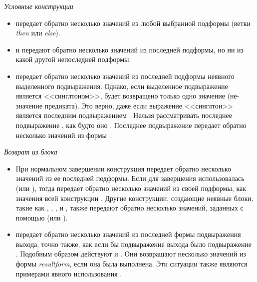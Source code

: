 \begin{flushdesc}
\item[\emph{Условные конструкции}]\leavevmode
\begin{itemize}

\item
{} передает обратно несколько значений из любой выбранной подформы (ветки
\emph{then} или \emph{else}).

\item
{} и  передают обратно несколько значений из последней подформы,
но ни из какой другой непоследней подформы.

\item
{} передает обратно несколько значений из последней подформы неявного
 выделенного подвыражения.
Однако, если выделенное подвыражение является <<синглтоном>>, будет возвращено
только одно значение (не-{\false} значение предиката).
Это верно, даже если выражение <<синглтон>> является последним подвыражением
.
Нельзя рассматривать последнее подвыражение , как будто оно . Последнее подвыражение передает обратно несколько значений из формы
.
\end{itemize}

\item[\emph{Возврат из блока}]\leavevmode
\begin{itemize}

\item
При нормальном завершении конструкция  передает обратно несколько значений из ее последней
подформы. Если для завершения использовалась  (или
), тогда  передает обратно несколько значений из
своей подформы, как значения всей конструкции  . Другие конструкции,
создающие неявные блоки, такие как 
, , ,  и
, также передают обратно несколько значений, заданных с помощью 
 (или ).

\item
{} передает обратно несколько значений из последней формы подвыражения
выхода, точно также, как если бы подвыражение выхода было подвыражение
.
Подобным образом действуют  и . Они возвращают
несколько значений из формы \emph{resultform}, если она была выполнена.
Эти ситуации также являются примерами явного использования .
\end{itemize}


\end{flushdesc}
